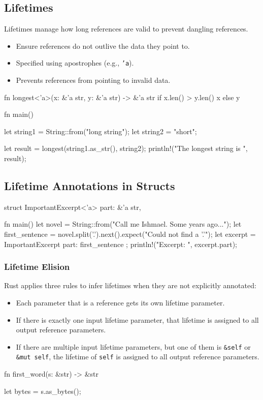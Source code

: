 \documentclass[8pt,a4paper,twocolumn]{extarticle}
\begin{document}
\begin{Code}
\section{Lifetimes}


Lifetimes manage how long references are valid to prevent dangling references.

\begin{itemize}
    \item Ensure references do not outlive the data they point to.
    \item Specified using apostrophes (e.g., \texttt{'a}).
    \item Prevents references from pointing to invalid data.
\end{itemize}

\begin{Code}
    fn longest<'a>(x: &'a str, y: &'a str) -> &'a str {
        if x.len() > y.len() {
            x
        } else {
            y
        }
    }
    
    fn main() {
        let string1 = String::from("long string");
        let string2 = "short";
    
        let result = longest(string1.as_str(), string2);
        println!("The longest string is {}", result);
    }
\end{Code}
\subsection{Lifetime Annotations in Structs}
\begin{Code}
    struct ImportantExcerpt<'a> {
        part: &'a str,
    }
    
    fn main() {
        let novel = String::from("Call me Ishmael. Some years ago...");
        let first_sentence = novel.split('.').next().expect("Could not find a '.'");
        let excerpt = ImportantExcerpt { part: first_sentence };
        println!("Excerpt: {}", excerpt.part);
    }
\end{Code}

\subsubsection{Lifetime Elision}
Rust applies three rules to infer lifetimes when they are not explicitly annotated:
\begin{itemize}
    \item Each parameter that is a reference gets its own lifetime parameter.
    \item If there is exactly one input lifetime parameter, that lifetime is assigned to all output
    reference parameters.
    \item If there are multiple input lifetime parameters, but one of them is \texttt{\&self} or \texttt{\&mut self}, the lifetime of \texttt{self} is assigned to all output reference parameters.
\end{itemize}
\begin{Code}
    fn first_word(s: &str) -> &str {
        let bytes = s.as_bytes();
    
}
\end{Code}
\end{Code}
\end{document}
